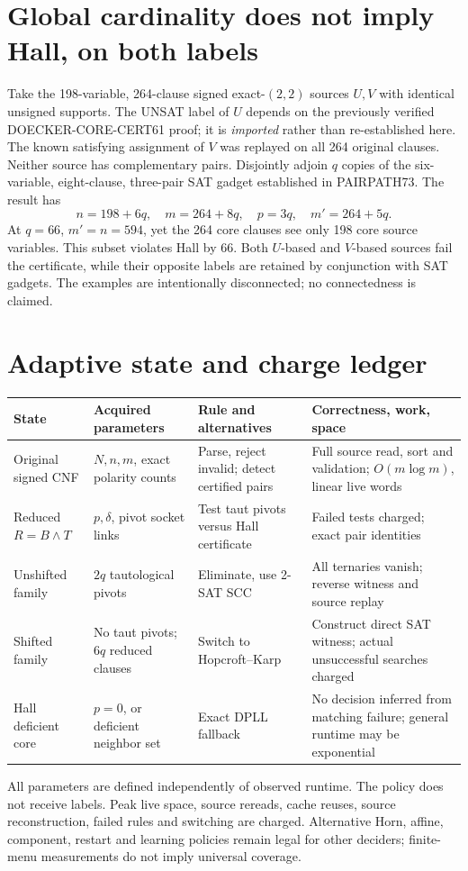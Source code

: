 \documentclass[11pt]{article}
\begin{document}
\section{Global cardinality does not imply Hall, on both labels}
Take the 198-variable, 264-clause signed exact-$(2,2)$ sources $U,V$ with identical unsigned supports. The UNSAT label of $U$ depends on the previously verified DOECKER-CORE-CERT61 proof; it is \emph{imported} rather than re-established here. The known satisfying assignment of $V$ was replayed on all 264 original clauses. Neither source has complementary pairs. Disjointly adjoin $q$ copies of the six-variable, eight-clause, three-pair SAT gadget established in PAIRPATH73. The result has
\[
 n=198+6q,\quad m=264+8q,\quad p=3q,\quad m'=264+5q.
\]
At $q=66$, $m'=n=594$, yet the 264 core clauses see only 198 core source variables. This subset violates Hall by 66. Both $U$-based and $V$-based sources fail the certificate, while their opposite labels are retained by conjunction with SAT gadgets. The examples are intentionally disconnected; no connectedness is claimed.
\section{Adaptive state and charge ledger}
\begin{center}\small
\begin{tabular}{p{.21\linewidth}p{.26\linewidth}p{.23\linewidth}p{.22\linewidth}}
\toprule
State & Acquired parameters & Rule and alternatives & Correctness, work, space\\\midrule
Original signed CNF & $N,n,m$, exact polarity counts & Parse, reject invalid; detect certified pairs & Full source read, sort and validation; $O(m\log m)$, linear live words\\
Reduced $R=B\wedge T$ & $p,\delta$, pivot socket links & Test taut pivots versus Hall certificate & Failed tests charged; exact pair identities\\
Unshifted family & $2q$ tautological pivots & Eliminate, use 2-SAT SCC & All ternaries vanish; reverse witness and source replay\\
Shifted family & No taut pivots; $6q$ reduced clauses & Switch to Hopcroft--Karp & Construct direct SAT witness; actual unsuccessful searches charged\\
Hall deficient core & $p=0$, or deficient neighbor set & Exact DPLL fallback & No decision inferred from matching failure; general runtime may be exponential\\
\bottomrule
\end{tabular}
\end{center}
All parameters are defined independently of observed runtime. The policy does not receive labels. Peak live space, source rereads, cache reuses, source reconstruction, failed rules and switching are charged. Alternative Horn, affine, component, restart and learning policies remain legal for other deciders; finite-menu measurements do not imply universal coverage.
\end{document}
